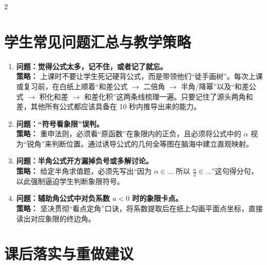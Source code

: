 \documentclass[11pt,a4paper]{ctexart}
\begin{document}
\begin{paracol}{2}

\end{paracol}

\newpage

\section{学生常见问题汇总与教学策略}

\begin{enumerate}[label=\arabic*. , leftmargin=2em, itemsep=0.4em]
  \item \textbf{问题：觉得公式太多，记不住，或者记了就忘。}
  \\ \textbf{策略：} 上课时不要让学生死记硬背公式，而是带领他们“徒手画树”。每次上课或复习前，在白纸上顺着“和差公式 $\rightarrow$ 二倍角 $\rightarrow$ 半角/降幂”以及“和差公式 $\rightarrow$ 积化和差 $\rightarrow$ 和差化积”这两条线梳理一遍。只要记住了源头两角和差，其他所有公式都应该具备在 10 秒内推导出来的能力。
  \item \textbf{问题：“符号看象限”误判。}
  \\ \textbf{策略：} 重申法则，必须看“原函数”在象限内的正负，且必须将公式中的 $\alpha$ 视为“锐角”来判断位置。通过诱导公式的几何全等图在脑海中建立直观映射。
  \item \textbf{问题：半角公式开方漏掉负号或多解讨论。}
  \\ \textbf{策略：} 给定半角求值题，必须先写出“因为 $\alpha \in \dots$ 所以 $\frac{\alpha}{2} \in \dots$”这句得分句，以此强制逼迫学生判断象限符号。
  \item \textbf{问题：辅助角公式中对负系数 $a<0$ 时的象限卡点。}
  \\ \textbf{策略：} 坚决贯彻“看点定角”口诀，将系数提取后在纸上勾画平面点坐标，直接读出对应象限的终边角。
\end{enumerate}

\section{课后落实与重做建议}
\end{document}
